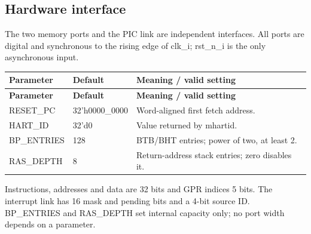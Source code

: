 \documentclass[11pt]{article}
\begin{document}
\subsection{Hardware interface}
\noindent The two memory ports and the PIC link are independent interfaces. All ports are digital and synchronous to the rising edge of clk\_i; rst\_n\_i is the only asynchronous input.\par\medskip
{\small
\begin{longtable}{@{}L{0.2500\dimexpr\linewidth-24pt\relax}L{0.2300\dimexpr\linewidth-24pt\relax}L{0.5200\dimexpr\linewidth-24pt\relax}@{}}
\toprule
\textbf{Parameter} & \textbf{Default} & \textbf{Meaning / valid setting} \\ \midrule
\endfirsthead
\toprule
\textbf{Parameter} & \textbf{Default} & \textbf{Meaning / valid setting} \\ \midrule
\endhead
RESET\_PC & 32'h0000\_0000 & Word-aligned first fetch address. \\ \addlinespace[3pt]
HART\_ID & 32'd0 & Value returned by mhartid. \\ \addlinespace[3pt]
BP\_ENTRIES & 128 & BTB/BHT entries; power of two, at least 2. \\ \addlinespace[3pt]
RAS\_DEPTH & 8 & Return-address stack entries; zero disables it. \\*
\bottomrule\end{longtable}}
\noindent Instructions, addresses and data are 32 bits and GPR indices 5 bits. The interrupt link has 16 mask and pending bits and a 4-bit source ID. BP\_ENTRIES and RAS\_DEPTH set internal capacity only; no port width depends on a parameter.\par\medskip
\end{document}
